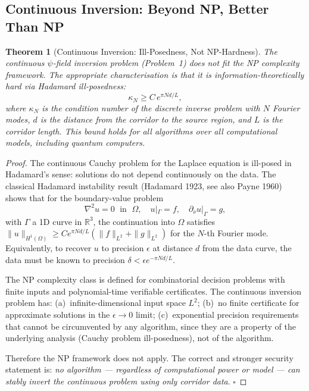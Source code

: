 \documentclass[aps,prd,twocolumn,superscriptaddress,nofootinbib]{revtex4-2}
\newtheorem{theorem}{Theorem}
\begin{document}
\subsection{Continuous Inversion: Beyond NP, Better Than NP}

\begin{theorem}[Continuous Inversion: Ill-Posedness, Not NP-Hardness]
\label{thm:ill-posed}
The continuous $\psi$-field inversion problem (Problem~1) does not fit
the NP complexity framework. The appropriate characterisation is that it
is \emph{information-theoretically hard} via Hadamard ill-posedness:
\begin{equation}
\kappa_N \geq C\,e^{\pi N d/L},
\label{eq:hadamard}
\end{equation}
where $\kappa_N$ is the condition number of the discrete inverse problem
with $N$ Fourier modes, $d$ is the distance from the corridor to the
source region, and $L$ is the corridor length. This bound holds for all
algorithms over all computational models, including quantum computers.
\end{theorem}

\begin{proof}
The continuous Cauchy problem for the Laplace equation is ill-posed in
Hadamard's sense: solutions do not depend continuously on the data.
The classical Hadamard instability result (Hadamard 1923, see also
Payne 1960) shows that for the boundary-value problem
\begin{equation}
\nabla^2 u = 0 \;\text{ in }\; \Omega,
\quad u|_\Gamma = f, \quad \partial_\nu u|_\Gamma = g,
\end{equation}
with $\Gamma$ a 1D curve in $\mathbb{R}^3$, the continuation into $\Omega$
satisfies $\|u\|_{H^1(\Omega)} \geq C e^{\pi N d/L} (\|f\|_{L^2} + \|g\|_{L^2})$
for the $N$-th Fourier mode. Equivalently, to recover $u$ to precision
$\epsilon$ at distance $d$ from the data curve, the data must be known
to precision $\delta < \epsilon e^{-\pi N d/L}$.

The NP complexity class is defined for combinatorial decision problems
with finite inputs and polynomial-time verifiable certificates. The
continuous inversion problem has:
(a)~infinite-dimensional input space $L^2$;
(b)~no finite certificate for approximate solutions in the $\epsilon \to 0$ limit;
(c)~exponential precision requirements that cannot be circumvented by
any algorithm, since they are a property of the underlying analysis
(Cauchy problem ill-posedness), not of the algorithm.

Therefore the NP framework does not apply. The correct and stronger
security statement is: \emph{no algorithm --- regardless of computational
power or model --- can stably invert the continuous problem using only
corridor data}. $\square$
\end{proof}
\end{document}
